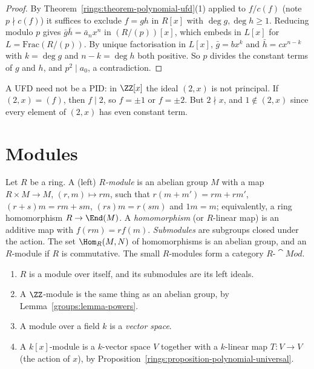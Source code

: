 \begin{proof}
By Theorem~\ref{rings:theorem-polynomial-ufd}(1) applied to $f/c(f)$ (note $p \nmid c(f)$) it
suffices to exclude $f = gh$ in $R[x]$ with $\deg g, \deg h \geq 1$. Reducing modulo $p$
gives $\bar g \bar h = \bar a_n x^n$ in $(R/(p))[x]$, which embeds in $L[x]$ for
$L = \mathrm{Frac}(R/(p))$. By unique factorisation in $L[x]$, $\bar g = bx^k$ and
$\bar h = cx^{n-k}$ with $k = \deg g$ and $n - k = \deg h$ both positive. So $p$ divides the
constant terms of $g$ and $h$, and $p^2 \mid a_0$, a contradiction.
\end{proof}

\begin{counterexample}\label{rings:counterexample-ufd-not-pid}
A UFD need not be a PID: in $\ZZ[x]$ the ideal $(2, x)$ is not principal. If
$(2, x) = (f)$, then $f \mid 2$, so $f = \pm 1$ or $f = \pm 2$. But $2 \nmid x$, and
$1 \notin (2, x)$ since every element of $(2, x)$ has even constant term.
\end{counterexample}

\section{Modules}\label{rings:section-modules}

\begin{definition}\label{rings:definition-module}
Let $R$ be a ring. A (left) \emph{$R$-module} is an abelian group $M$ with a map
$R \times M \to M$, $(r, m) \mapsto rm$, such that $r(m + m') = rm + rm'$,
$(r + s)m = rm + sm$, $(rs)m = r(sm)$ and $1m = m$; equivalently, a ring homomorphism
$R \to \End(M)$. A \emph{homomorphism} (or $R$-linear map) is an additive map with
$f(rm) = rf(m)$. \emph{Submodules} are subgroups closed under the action. The set
$\Hom_R(M, N)$ of homomorphisms is an abelian group, and an $R$-module if $R$ is
commutative. The small $R$-modules form a category $R\text{-}\cat{Mod}$.
\end{definition}

\begin{example}\label{rings:example-modules}
\begin{enumerate}
\item $R$ is a module over itself, and its submodules are its left ideals.
\item A $\ZZ$-module is the same thing as an abelian group, by Lemma~\ref{groups:lemma-powers}.
\item A module over a field $k$ is a \emph{vector space}.
\item A $k[x]$-module is a $k$-vector space $V$ together with a $k$-linear map
$T \colon V \to V$ (the action of $x$), by Proposition~\ref{rings:proposition-polynomial-universal}.
\end{enumerate}
\end{example}

